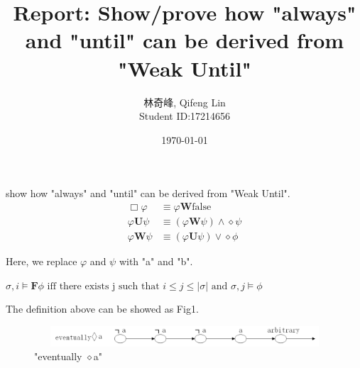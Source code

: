 \documentclass[10pt]{llncs}
\begin{document}
    \title{Report: Show/prove how "always" and "until" can be derived from "Weak Until"}
    \author{林奇峰, Qifeng Lin\\Student ID:17214656}
    \date{\today}
    \maketitle

    \begin{question}
         show how "always" and "until" can be derived from "Weak Until".
        \begin{align*}
          \Box\varphi &\equiv \varphi\textbf{W}\text{false} \\
          \varphi\textbf{U}\psi & \equiv(\varphi\textbf{W}\psi)\wedge\diamond\psi\\
          \varphi\textbf{W}\psi &\equiv( \varphi\textbf{U}\psi)\vee\diamond\phi
        \end{align*}
    \end{question}
    Here, we replace $\varphi$ and $\psi$ with "a" and "b".
    \begin{definition}
        $\sigma,i\models\textbf{F}\phi \text{ iff there exists j such that }i\leq j\leq|\sigma| \text{ and } \sigma,j\models\phi$
    \end{definition}
    The definition above can be showed as Fig1.
    \begin{figure}[H]
      \centering
      \includegraphics[width=5.0in,height=0.3in]{7.png}
      \caption{"eventually $\diamond$a"}
    \end{figure}
\end{document}
